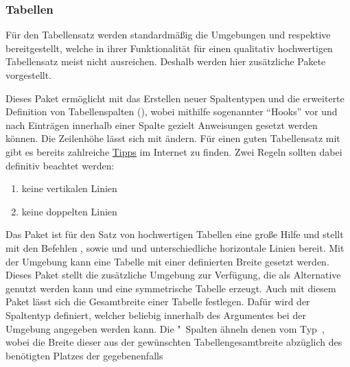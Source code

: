 \subsubsection{%
  Tabellen%
}
%
Für den Tabellensatz werden standardmäßig die Umgebungen  
und  respektive  bereitgestellt, 
welche in ihrer Funktionalität für einen qualitativ hochwertigen Tabellensatz 
meist nicht ausreichen. Deshalb werden hier zusätzliche Pakete vorgestellt. 
%
\begin{DeclarePackages}
  Dieses Paket ermöglicht mit  das Erstellen neuer 
  Spaltentypen und die erweiterte Definition von Tabellenspalten
  (\PValue{>\MPValue{\dots}}\PValue{<\MPValue{\dots}}), 
  wobei mithilfe sogenannter \enquote{Hooks} vor und nach Einträgen innerhalb 
  einer Spalte gezielt Anweisungen gesetzt werden können. Die Zeilenhöhe lässt 
  sich mit  ändern. 
  Für einen guten Tabellensatz mit  gibt es bereits zahlreiche 
  \href{http://userpage.fu-berlin.de/latex/Materialien/tabsatz.pdf}{Tipps} im 
  Internet zu finden. Zwei Regeln sollten dabei definitiv beachtet werden:
  \begin{enumerate}[itemindent=0pt,labelwidth=*,labelsep=1em,label=\Roman*.]
  \item keine vertikalen Linien
  \item keine doppelten Linien
  \end{enumerate}
  Das Paket  ist für den Satz von hochwertigen Tabellen eine 
  große Hilfe und stellt mit den Befehlen ,  
  sowie  und  und unterschiedliche horizontale 
  Linien bereit.
  Mit der Umgebung  kann eine Tabelle mit einer 
  definierten Breite gesetzt werden. Dieses Paket stellt die zusätzliche 
  Umgebung  zur Verfügung, die als Alternative genutzt 
  werden kann und eine symmetrische Tabelle erzeugt.
  Auch mit diesem Paket lässt sich die Gesamtbreite einer Tabelle festlegen. 
  Dafür wird der Spaltentyp  definiert, welcher beliebig innerhalb 
  des Argumentes  bei der Umgebung 
  angegeben werden kann. Die "~Spalten ähneln denen vom 
  Typ~, wobei die Breite dieser aus der gewünschten 
  Tabellengesamtbreite abzüglich des benötigten Platzes der gegebenenfalls 

\end{DeclarePackages}
